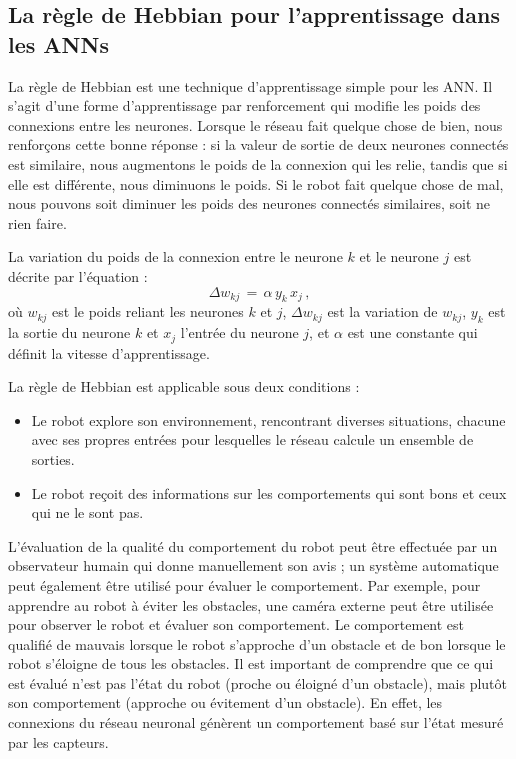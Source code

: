 \subsection{La règle de Hebbian pour l'apprentissage dans les ANNs}\label{s.hebbian-rule}

La règle de Hebbian est une technique d'apprentissage simple pour les ANN. Il s'agit d'une forme d'apprentissage par renforcement qui modifie les poids des connexions entre les neurones. Lorsque le réseau fait quelque chose de bien, nous renforçons cette bonne réponse : si la valeur de sortie de deux neurones connectés est similaire, nous augmentons le poids de la connexion qui les relie, tandis que si elle est différente, nous diminuons le poids. Si le robot fait quelque chose de mal, nous pouvons soit diminuer les poids des neurones connectés similaires, soit ne rien faire.

La variation du poids de la connexion entre le neurone $k$ et le neurone $j$ est décrite par l'équation :
\[
\Delta w_{kj}\,=\,\alpha \, y_{k} \, x_{j}\,,\label{eq.hebbian}
\]
où $w_{kj}$ est le poids reliant les neurones $k$ et $j$, $\Delta w_{kj}$ est la variation de $w_{kj}$, $y_{k}$ est la sortie du neurone $k$ et $x_{j}$ l'entrée du neurone $j$, et $\alpha$ est une constante qui définit la vitesse d'apprentissage. 

La règle de Hebbian est applicable sous deux conditions :
\begin{itemize}
\item Le robot explore son environnement, rencontrant diverses situations, chacune avec ses propres entrées pour lesquelles le réseau calcule un ensemble de sorties.
\item Le robot reçoit des informations sur les comportements qui sont bons et ceux qui ne le sont pas.
\end{itemize}
L'évaluation de la qualité du comportement du robot peut être effectuée par un observateur humain qui donne manuellement son avis ; un système automatique peut également être utilisé pour évaluer le comportement. Par exemple, pour apprendre au robot à éviter les obstacles, une caméra externe peut être utilisée pour observer le robot et évaluer son comportement. Le comportement est qualifié de mauvais lorsque le robot s'approche d'un obstacle et de bon lorsque le robot s'éloigne de tous les obstacles. Il est important de comprendre que ce qui est évalué n'est pas l'état du robot (proche ou éloigné d'un obstacle), mais plutôt son comportement (approche ou évitement d'un obstacle). En effet, les connexions du réseau neuronal génèrent un comportement basé sur l'état mesuré par les capteurs.

